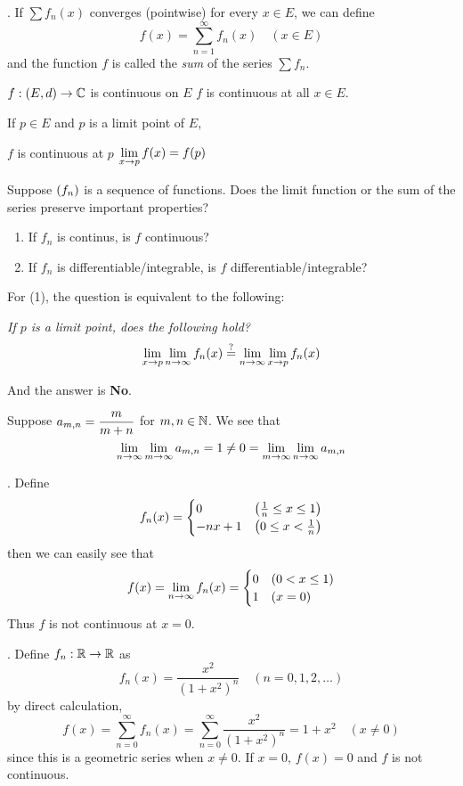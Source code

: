 . If \(\sum f_n(x)\) converges (pointwise) for every \(x \in E\), we can define
\[
    f(x) = \sum_{n=1}^\infty f_n(x) \quad (x \in E)
\]
and the function \(f\) is called the \textit{sum} of the series \(\sum f_n\).

\recall \(f: (E, d) \rightarrow \mathbb{C}\) is continuous on \(E\) \miff \(f\) is continuous at all \(x \in E\).

\recall {} If \(p \in E\) and \(p\) is a limit point of \(E\),
\begin{center}
    \(f\) is continuous at \(p\) \miff \(\displaystyle \lim_{x \rightarrow p} f(x) = f(p)\)
\end{center}

\question Suppose \(\left( f_n \right)\) is a sequence of functions. Does the limit function or the sum of the series preserve important properties?
\begin{enumerate}
    \item If \(f_n\) is continus, is \(f\) continuous?
    \item If \(f_n\) is differentiable/integrable, is \(f\) differentiable/integrable?
\end{enumerate}

For (1), the question is equivalent to the following:

\textit{If \(p\) is a limit point, does the following hold?}
\[
    \lim_{x\rightarrow p} \lim_{n\rightarrow \infty} f_n(x) \overset{?}{=} \lim_{n\rightarrow \infty} \lim_{x\rightarrow p}f_n(x)
\]

And the answer is \textbf{No}.

 Suppose \(\displaystyle a_{m, n} = \frac{m}{m + n}\) for \(m, n\in \mathbb{N}\). We see that
\[
    \lim_{n \rightarrow \infty} \lim_{m \rightarrow \infty} a_{m, n} = 1 \neq 0 = \lim_{m \rightarrow \infty} \lim_{n \rightarrow \infty} a_{m, n}
\]

\ex. Define
\[
    f_n(x) = \begin{cases}
        0       & \left( \frac{1}{n} \leq x \leq 1 \right) \\
        -nx + 1 & \left( 0 \leq x < \frac{1}{n} \right)
    \end{cases}
\]
then we can easily see that
\[
    f(x) = \lim_{n\rightarrow \infty} f_n(x) = \begin{cases}
        0 & (0 < x \leq 1) \\
        1 & (x = 0)
    \end{cases}
\]
Thus \(f\) is not continuous at \(x = 0\).

\ex. Define \(f_n: \mathbb{R} \rightarrow \mathbb{R}\) as
\[
    f_n(x) = \frac{x^2}{(1+x^2)^n} \quad (n = 0, 1, 2, \dots)
\]
by direct calculation,
\[
    f(x) = \sum_{n = 0}^\infty f_n(x) = \sum_{n = 0}^\infty \frac{x^2}{(1+x^2)^n} = 1 + x^2 \quad (x \neq 0)
\]
since this is a geometric series when \(x \neq 0\). If \(x = 0\), \(f(x) = 0\) and \(f\) is not continuous.


